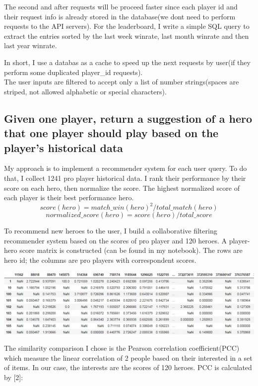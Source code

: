 \noindent The second and after requests will be proceed faster since each player id and their request info is already stored in the database(we dont need to perform requests to the API servers). For the leaderboard, I write a simple SQL query to extract the entries sorted by the last week winrate, last month winrate and then last year winrate.

\noindent In short, I use a databas as a cache to speed up the next requests by user(if they perform some duplicated player\_id requests). \\

\noindent The user inputs are filtered to accept only a list of number strings(spaces are striped, not allowed alphabetic or special characters). \\

\subsection{Given one player, return a suggestion of a hero that one player should play based on the player's historical data}

My approach is to implement a recommender system for each user query. To do that, I collect 1241 pro player historical data. I rank their performance by their score on each hero, then normalize the score. The highest normalized score of each player is their best performance hero.
    $$score(hero) = match\_win(hero)^2 / total\_match(hero)$$
    $$normalized\_score(hero) = score(hero) / total\_score$$

\noindent To recommend new heroes to the user, I build a collaborative filtering recommender system based on the scores of pro player and 120 heroes. A player-hero score matrix is constructed (can be found in my notebook). The rows are hero id; the columns are pro players with correspondent scores.

\begin{center}
    \includegraphics[scale=0.6]{./fig/matrix.jpg}
\end{center}

\noindent The similarity comparison I chose is the Pearson correlation coefficient(PCC) which measure the linear correlation of 2 people based on their interested in a set of items. In our case, the interests are the scores of 120 heroes. PCC is calculated by [2]:

